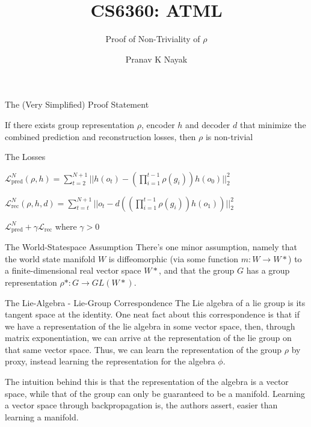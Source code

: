 \documentclass{beamer}
\title{CS6360: ATML}
\subtitle{Proof of Non-Triviality of $\rho$}
\author{Pranav K Nayak}
\institute{IIT Hyderabad}
\date{}
\begin{document}
\begin{frame}
  \titlepage
\end{frame}
\begin{frame}{The (Very Simplified) Proof Statement}
 \begin{theorem}
  If there exists group representation $\rho$, encoder $h$ and decoder $d$ that minimize the combined prediction and reconstruction losses, then $\rho$ is non-trivial
 \end{theorem} 
\end{frame}
\begin{frame}{The Losses}
  \begin{definition}
        $\mathcal{L}_{\text{pred}}^N(\rho, h) = \sum_{t = 2}^{N+1} || h(o_{t}) -  (\prod_{i = 1}^{t-1} \rho(g_{i}))h(o_0)||_2^2  $
\end{definition}  
\begin{definition}
  $\mathcal{L}_{\text{rec}}^N (\rho, h, d) = \sum_{t = t}^{N+1}||o_t - d((\prod_{i = 1}^{t-1}\rho(g_i))h(o_1))||_2^2 $
\end{definition}
  \begin{definition}
    $\mathcal{L}_{\text{pred}}^N + \gamma \mathcal{L}_{\text{rec}}$ where $\gamma > 0$
  \end{definition}
\end{frame}
\begin{frame}{The World-Statespace Assumption}
  There's one minor assumption, namely that the world state manifold $W$ is diffeomorphic (via some function $m: W \rightarrow W*$) to a finite-dimensional real vector space $W*$, and that the group $G$ has a group representation $\rho* : G \rightarrow GL(W*)$. 
\end{frame}
\begin{frame}{The Lie-Algebra - Lie-Group Correspondence}
  The Lie algebra of a lie group is its tangent space at the identity. One neat fact about this correspondence is that if we have a representation of the lie algebra in some vector space, then, through matrix exponentiation, we can arrive at the representation of the lie group on that same vector space. Thus, we can learn the representation of the group $\rho$ by proxy, instead learning the representation for the algebra $\phi$. 

  The intuition behind this is that the representation of the algebra is a vector space, while that of the group can only be guaranteed to be a manifold. Learning a vector space through backpropagation is, the authors assert, easier than learning a manifold.
\end{frame}
\end{document}
